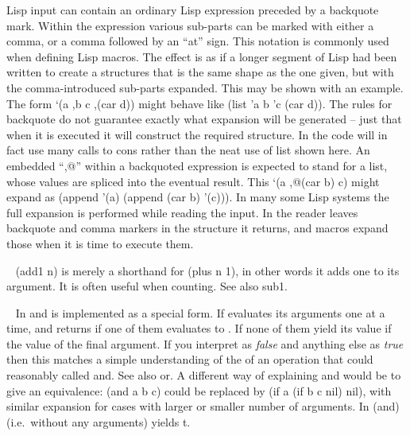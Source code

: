 \begin{description}
Lisp input can contain an ordinary Lisp expression preceded by a backquote
mark. Within the expression various sub-parts can be marked with
either a comma, or a comma followed by an ``at'' sign. This notation is
commonly used when defining Lisp macros. The effect is as if a longer
segment of Lisp had been written to create a structures that is the same
shape as the one given, but with the comma-introduced sub-parts expanded.
This may be shown with an example. The form {\tx `(a ,b c ,(car d))}
might behave like {\tx (list 'a b 'c (car d))}. The rules for backquote
do not guarantee exactly what expansion will be generated -- just that when
it is executed it will construct the required structure. In \vsl{} the code
will in fact use many calls to {\tx cons} rather than the neat use of
{\tx list} shown here. An embedded ``{\tx ,@}'' within a backquoted
expression is expected to stand for a list, whose values are spliced into
the eventual result. This {\tx `(a ,@(car b) c)} might expand as
{\tx (append '(a) (append (car b) '(c)))}. In many some Lisp
systems the full expansion is performed while reading the input. In \vsl{} the
reader leaves backquote and comma markers in the structure it returns, and
macros expand those when it is time to execute them.
\item[{\tx add1~~~~~~~~~} \hspace{1cm} {\em function 1 arg}]~\newline
{\tx (add1 n)} is merely a shorthand for {\tx (plus n 1)}, in
other words it adds one to its argument. It is often useful when counting. See
also {\tx sub1}.
\item[{\tx and~~~~~~~~~~} \hspace{1cm} {\em function n args}]~\newline
In \vsl{} {\tx and} is implemented as a special form. If evaluates its
arguments one at a time, and returns \nil{} if one of them evaluates
to \nil. If none of them yield \nil{} its value if the value of the final
argument. If you interpret \nil{} as {\em false} and anything else as
{\em true} then this matches a simple understanding of the of an operation that
could reasonably called {\tx and}. See also {\tx or}.
A different way of explaining {\tx and} would be to give an
equivalence: {\tx (and a b c)} could be replaced by
{\tx (if a (if b c nil) nil)}, with similar expansion for cases with
larger or smaller number of arguments. In \vsl{} {\tx (and)} (i.e.\  without
any arguments) yields {\tx t}.
\item[{\tx append~~~~~~~} \hspace{1cm} {\em function 2 args}]~\newline

\end{description}
